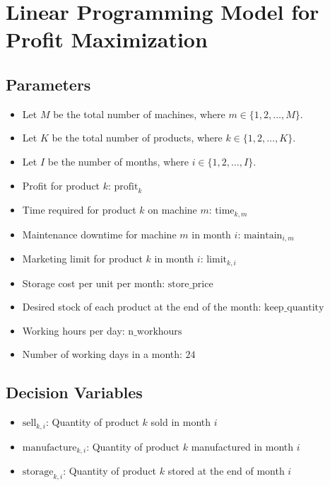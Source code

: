 \documentclass{article}
\begin{document}
\section*{Linear Programming Model for Profit Maximization}

\subsection*{Parameters}
\begin{itemize}
    \item Let \( M \) be the total number of machines, where \( m \in \{1, 2, \ldots, M\} \).
    \item Let \( K \) be the total number of products, where \( k \in \{1, 2, \ldots, K\} \).
    \item Let \( I \) be the number of months, where \( i \in \{1, 2, \ldots, I\} \).
    \item Profit for product \( k \): \( \text{profit}_{k} \)
    \item Time required for product \( k \) on machine \( m \): \( \text{time}_{k, m} \)
    \item Maintenance downtime for machine \( m \) in month \( i \): \( \text{maintain}_{i, m} \)
    \item Marketing limit for product \( k \) in month \( i \): \( \text{limit}_{k, i} \)
    \item Storage cost per unit per month: \( \text{store\_price} \)
    \item Desired stock of each product at the end of the month: \( \text{keep\_quantity} \)
    \item Working hours per day: \( \text{n\_workhours} \)
    \item Number of working days in a month: \( 24 \)
\end{itemize}

\subsection*{Decision Variables}
\begin{itemize}
    \item \( \text{sell}_{k, i} \): Quantity of product \( k \) sold in month \( i \)
    \item \( \text{manufacture}_{k, i} \): Quantity of product \( k \) manufactured in month \( i \)
    \item \( \text{storage}_{k, i} \): Quantity of product \( k \) stored at the end of month \( i \)
\end{itemize}
\end{document}

